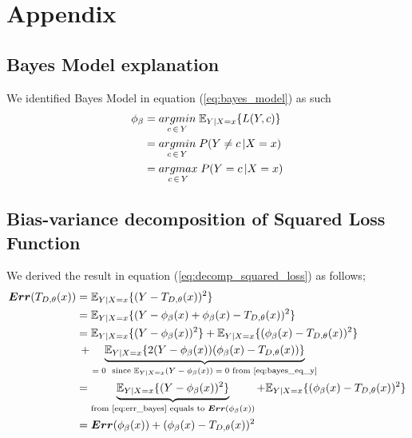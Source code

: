 \section{Appendix}
\label{sec:appendix}
\subsection{Bayes Model explanation}
\label{app:bayes_model}
We identified Bayes Model in equation (\ref{eq:bayes_model}) as such
\begin{align}
\phi_{\beta} & = \underset{c \,\in\, Y}{argmin} \; \mathbb{E}_{Y|X=x}\{L(Y,c) \} \notag\\
			 & = \underset{c \,\in\, Y}{argmin} \; P(Y \neq c \,| X = x) \notag\\
			 & = \underset{c \,\in\, Y}{argmax} \; P(Y = c \,| X = x)\notag
\end{align}

\subsection{Bias-variance decomposition of Squared Loss Function}
\label{app:bias_var_decomp}
We derived the result in equation (\ref{eq:decomp_squared_loss}) as follows;
\begin{align}
\boldsymbol{Err}(T_{D, \theta}(x)) & = \mathbb{E}_{Y|X=x}\{(Y-T_{D,\theta}(x))^2\} \notag \\
							  & = \mathbb{E}_{Y|X=x}\{(Y -\phi_{\beta}(x) +\phi_{\beta}(x) -T_{D,\theta}(x))^2\} \notag \\
							  & = \mathbb{E}_{Y|X=x}\{(Y-\phi_{\beta}(x))^2\} + \mathbb{E}_{Y|X=x}\{(\phi_{\beta}(x)-T_{D,\theta}(x))^2\} \notag \\
							  &	\: + \underbrace{\mathbb{E}_{Y|X=x}\{2(Y-\phi_{\beta}(x))(\phi_{\beta}(x)-T_{D,\theta}(x))\}}_\text{$=0$ \ since $ \mathbb{E}_{Y|X=x}(Y-\phi_{\beta}(x)) = 0$ from \ref{eq:bayes_eq_y}}  \notag \\
							  & = \underbrace{\mathbb{E}_{Y|X=x}\{(Y-\phi_{\beta}(x))^2\}}_\text{from \ref{eq:err_bayes} equals to $\boldsymbol{Err}(\phi_{\beta}(x))$} + \mathbb{E}_{Y|X=x}\{(\phi_{\beta}(x)-T_{D,\theta}(x))^2\}  \notag \\
							  & = \boldsymbol{Err}(\phi_{\beta}(x)) + (\phi_{\beta}(x)-T_{D,\theta}(x))^2\notag
\end{align}


